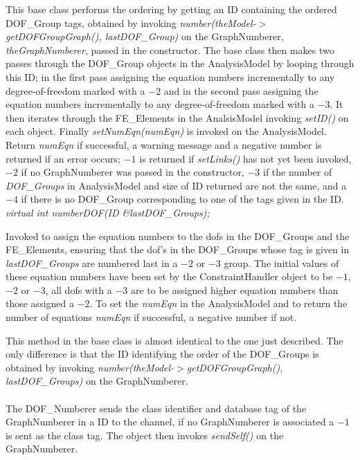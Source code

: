 This base class performs the ordering by getting an ID containing the
ordered DOF\_Group tags, obtained by invoking {\em
number(theModel-$>$getDOFGroupGraph(), lastDOF\_Group)} on the
GraphNumberer, {\em theGraphNumberer}, passed in the constructor. The
base class then makes two passes through the DOF\_Group objects in the
AnalysisModel by looping through this ID; in the first pass assigning the
equation numbers incrementally to any degree-of-freedom marked with a
$-2$ and in the second pass assigning the equation numbers
incrementally to any degree-of-freedom marked with a $-3$. It then
iterates through the FE\_Elements in the AnalsisModel invoking {\em
setID()} on each object. Finally {\em setNumEqn(numEqn)} is invoked on
the AnalysisModel. Return {\em numEqn} if successful, a warning
message and a negative number is returned if an error occurs; $-1$ is
returned if {\em setLinks()} has not yet been invoked, $-2$ if no
GraphNumberer was passed in the constructor, $-3$ if the
number of {\em DOF\_Groups} in AnalysisModel and size of ID returned
are not the same, and a $-4$ if there is no DOF\_Group corresponding
to one of the tags given in the ID.\\



{\em virtual int numberDOF(ID \&lastDOF\_Groups);} 

Invoked to assign the equation numbers to the dofs in the DOF\_Groups
and the FE\_Elements, ensuring that the dof's in the DOF\_Groups whose
tag is given in {\em lastDOF\_Groups} are numbered last in a $-2$ or
$-3$ group. The initial values of these equation numbers have been set
by the ConstraintHandler object to be $-1$, $-2$ or $-3$, all dofs
with a $-3$ are to be assigned higher equation numbers than those
assigned a $-2$. To set the {\em numEqn} in the AnalysisModel and to
return the number of equations {\em numEqn} if successful, a negative
number if not.  

This method in the base class is almost identical to the one just
described. The only difference is that the ID identifying the order of
the DOF\_Groups is obtained by invoking {\em
number(theModel-$>$getDOFGroupGraph(), lastDOF\_Groups)} on the
GraphNumberer. \\



\\ 
The DOF\_Numberer sends the class identifier and database tag of the
GraphNumberer in a ID to the channel, if no GraphNumberer is
associated a $-1$ is sent as the class tag. The object then invokes
{\em sendSelf()} on the GraphNumberer. \\ 

